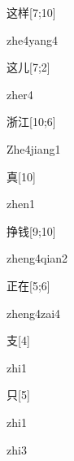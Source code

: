 \begin{verbete}{这样}[7;10]
\begin{pronuncia}{zhe4yang4}
\end{pronuncia}
\end{verbete}

\begin{verbete}[zher4]{这儿}[7;2]
\begin{pronuncia}{zher4}
\end{pronuncia}
\end{verbete}

\begin{verbete}{浙江}[10;6]
\begin{pronuncia}{Zhe4jiang1}
\end{pronuncia}
\end{verbete}

\begin{verbete}[zhen1]{真}[10]
\begin{pronuncia}{zhen1}
\end{pronuncia}
\end{verbete}

\begin{verbete}{挣钱}[9;10]
\begin{pronuncia}{zheng4qian2}
\end{pronuncia}
\end{verbete}

\begin{verbete}{正在}[5;6]
\begin{pronuncia}{zheng4zai4}
\end{pronuncia}
\end{verbete}

\begin{verbete}[zhi1]{支}[4]
\begin{pronuncia}{zhi1}
\end{pronuncia}
\end{verbete}

\begin{verbete}[zhi1]{只}[5]
\begin{pronuncia}{zhi1} 
\end{pronuncia}
\begin{pronuncia}{zhi3}
\end{pronuncia}
\end{verbete}

